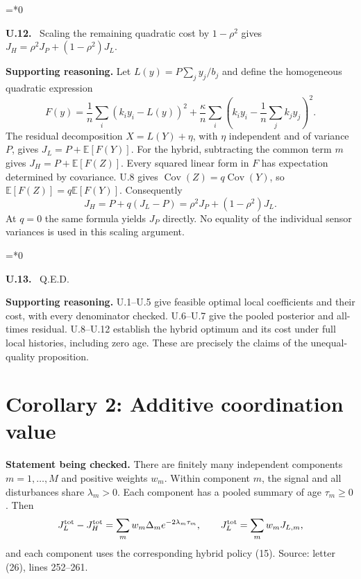 \documentclass[12pt,letterpaper]{article}
\newcommand{\E}{\mathbb E}
\newcommand{\Cov}{\operatorname{Cov}}
\newenvironment{proofstep}[2]{%
  \begin{list}{}{\leftmargin=\dimexpr 0.17in*#2\relax%
  \setlength{\rightmargin}{0pt}\setlength{\topsep}{5pt}\setlength{\parsep}{2pt}}%
  \item[]\textbf{\textcolor{ink}{#1.}}\ }{\end{list}}
\begin{document}
\begin{proofstep}{U.12}{0}
\label{step:U.12}
Scaling the remaining quadratic cost by $1-\rho^2$ gives $J_H=\rho^2J_P+(1-\rho^2)J_L$.

\textbf{Supporting reasoning.}
Let $L(y)=P\sum_jy_j/b_j$ and define the homogeneous quadratic expression
\[
F(y)=\frac1n\sum_i(k_i y_i-L(y))^2+
\frac\kappa n\sum_i\left(k_iy_i-\frac1n\sum_jk_jy_j\right)^2.
\]
The residual decomposition $X=L(Y)+\eta$, with $\eta$ independent and of variance $P$, gives $J_L=P+\E[F(Y)]$. For the hybrid, subtracting the common term $m$ gives $J_H=P+\E[F(Z)]$. Every squared linear form in $F$ has expectation determined by covariance. U.8 gives $\Cov(Z)=q\Cov(Y)$, so $\E[F(Z)]=q\E[F(Y)]$. Consequently
\[
J_H=P+q(J_L-P)=\rho^2J_P+(1-\rho^2)J_L.
\]
At $q=0$ the same formula yields $J_P$ directly. No equality of the individual sensor variances is used in this scaling argument.
\par{}
\end{proofstep}

\begin{proofstep}{U.13}{0}
\label{step:U.13}
Q.E.D.

\textbf{Supporting reasoning.}
U.1--U.5 give feasible optimal local coefficients and their cost, with every denominator checked. U.6--U.7 give the pooled posterior and all-times residual. U.8--U.12 establish the hybrid optimum and its cost under full local histories, including zero age. These are precisely the claims of the unequal-quality proposition.
\par{}
\end{proofstep}

\clearpage
\section{Corollary 2: Additive coordination value}\label{contract-C}

\textbf{Statement being checked.}
There are finitely many independent components $m=1,\ldots,M$ and positive weights $w_m$. Within component $m$, the signal and all disturbances share $\lambda_m>0$. Each component has a pooled summary of age $\tau_m\ge0$. Then
\[
J_L^{\rm tot}-J_H^{\rm tot}=\sum_mw_m\Delta_m e^{-2\lambda_m\tau_m},\qquad
J_L^{\rm tot}=\sum_mw_mJ_{L,m},
\]
and each component uses the corresponding hybrid policy (15).
\noindent Source: letter (26), lines 252--261.
\end{document}
